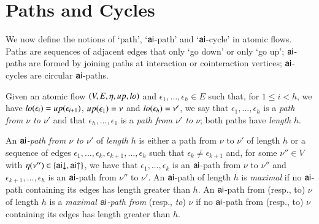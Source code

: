 \section{Paths and Cycles}\label{section:PathsAndCycles}

We now define the notions of `path', `${\mathsf{ai}}$-path' and `${\mathsf{ai}}$-cycle' in atomic flows. Paths are sequences of adjacent edges that only `go down' or only `go up'; ${\mathsf{ai}}$-paths are formed by joining paths at interaction or cointeraction vertices; ${\mathsf{ai}}$-cycles are circular ${\mathsf{ai}}$-paths.

\begin{definition}\label{definition:FlowPaths}
Given an atomic flow $(V,E,\eta,{\mathit up},{\mathit lo})$ and $\epsilon_1,\dots,\epsilon_h\in E$ such that, for $1\le i<h$, we have ${\mathit lo}(\epsilon_i)={\mathit up}(\epsilon_{i+1})$, ${\mathit up}(\epsilon_1)=\nu$ and ${\mathit lo}(\epsilon_h)=\nu'$, we say that $\epsilon_1,\dots,\epsilon_h$ is a \emph{path from $\nu$ to $\nu'$} and that $\epsilon_h,\dots,\epsilon_1$ is a \emph{path from $\nu'$ to $\nu$}; both paths have \emph{length} $h$.

An \emph{${\mathsf{ai}}$-path from $\nu$ to $\nu'$} of \emph{length} $h$ is either a path from $\nu$ to $\nu'$ of length $h$ or a sequence of edges $\epsilon_1,\dots,\epsilon_k,\epsilon_{k+1},\dots,\epsilon_h$ such that $\epsilon_k \ne \epsilon_{k+1}$ and, for some $\nu''\in V$ with $\eta(\nu'')\in\{{{\mathsf{ai}}{\downarrow}},{{\mathsf{ai}}{\uparrow}}\}$, we have that $\epsilon_1,\dots,\epsilon_k$ is an ${\mathsf{ai}}$-path from $\nu$ to $\nu''$ and $\epsilon_{k+1},\dots,\epsilon_h$ is an ${\mathsf{ai}}$-path from $\nu''$ to $\nu'$. An ${\mathsf{ai}}$-path of length $h$ is \emph{maximal} if no ${\mathsf{ai}}$-path containing its edges has length greater than $h$. An ${\mathsf{ai}}$-path from (resp., to) $\nu$ of length $h$ is a \emph{maximal\/ ${\mathsf{ai}}$-path from} (resp., \emph{to}) $\nu$ if no ${\mathsf{ai}}$-path from (resp., to) $\nu$ containing its edges has length greater than $h$.
\end{definition}

